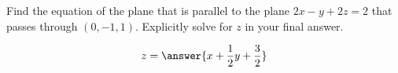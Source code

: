 \documentclass{ximera}
\author{Jim Talamo}
\begin{document}
\begin{exercise}
Find the equation of the plane that is parallel to the plane $2x-y+2z=2$ that passes through $(0,-1,1)$.  Explicitly solve for $z$ in your final answer.

\[
z = \answer{x+\frac{1}{2}y+\frac{3}{2}}
\]

\end{exercise}
\end{document}
